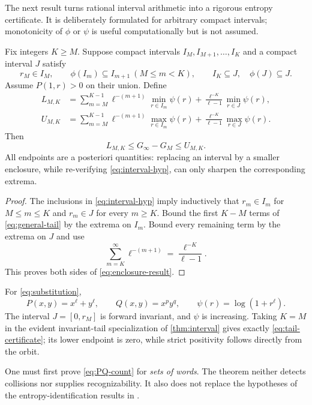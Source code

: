 The next result turns rational interval arithmetic into a rigorous entropy
certificate.  It is deliberately formulated for arbitrary compact intervals;
monotonicity of $\phi$ or $\psi$ is useful computationally but is not assumed.

\begin{theorem}
\label{thm:interval}
Fix integers $K\ge M$.  Suppose compact intervals
$I_M,I_{M+1},\ldots,I_K$ and a compact interval $J$ satisfy
\begin{equation}
 r_M\in I_M,\qquad
 \phi(I_m)\subseteq I_{m+1}\ (M\le m<K),\qquad
 I_K\subseteq J,\quad \phi(J)\subseteq J.
 \label{eq:interval-hyp}
\end{equation}
Assume $P(1,r)>0$ on their union.  Define
\begin{align}
 L_{M,K}&=\sum_{m=M}^{K-1}\ell^{-(m+1)}\min_{r\in I_m}\psi(r)
 +\frac{\ell^{-K}}{\ell-1}\min_{r\in J}\psi(r),\label{eq:enclosure-L}\\
 U_{M,K}&=\sum_{m=M}^{K-1}\ell^{-(m+1)}\max_{r\in I_m}\psi(r)
 +\frac{\ell^{-K}}{\ell-1}\max_{r\in J}\psi(r).
 \label{eq:enclosure-U}
\end{align}
Then
\begin{equation}
 L_{M,K}\le G_\infty-G_M\le U_{M,K}.
 \label{eq:enclosure-result}
\end{equation}
All endpoints are a posteriori quantities: replacing an interval by a
smaller enclosure, while re-verifying \cref{eq:interval-hyp}, can only sharpen
the corresponding extrema.
\end{theorem}

\begin{proof}
The inclusions in \cref{eq:interval-hyp} imply inductively that
$r_m\in I_m$ for $M\le m\le K$ and $r_m\in J$ for every $m\ge K$.
Bound the first $K-M$ terms of \cref{eq:general-tail} by the extrema on
$I_m$.  Bound every remaining term by the extrema on $J$ and use
\[
 \sum_{m=K}^{\infty}\ell^{-(m+1)}
 =\frac{\ell^{-K}}{\ell-1}.
\]
This proves both sides of \cref{eq:enclosure-result}.
\end{proof}

\begin{example}
For \cref{eq:substitution},
\[
 P(x,y)=x^\ell+y^\ell,\qquad Q(x,y)=x^py^q,\qquad
 \psi(r)=\log(1+r^\ell).
\]
The interval $J=[0,r_M]$ is forward invariant, and $\psi$ is increasing.
Taking $K=M$ in the evident invariant-tail specialization of
\cref{thm:interval} gives exactly \cref{eq:tail-certificate}; its lower
endpoint is zero, while strict positivity follows directly from the orbit.
\end{example}

\begin{remark}
One must first prove \cref{eq:PQ-count} for \emph{sets of words}.  The
theorem neither detects collisions nor supplies recognizability.  It also
does not replace the hypotheses of the entropy-identification results in
\cite{Gohlke2020,Mitchell2024}.
\end{remark}
